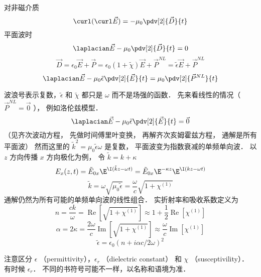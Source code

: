 
对非磁介质
\begin{equation}
  \curl (\curl \vec E) =  - {\mu_0} \pdv[2]{\vec D}{t}
 \end{equation}
平面波时
 \begin{equation}
  {\laplacian}\vec E - {\mu_0} \pdv[2]{\vec D}{t} = 0
 \end{equation}
 \begin{equation}
\vec D = {\epsilon_0}\vec E + \vec P = {\epsilon_0}(1 + \tilde \chi )\vec E + {\vec P^{NL}} = \tilde \epsilon \vec E + {\vec P^{NL}}
 \end{equation}
 \begin{equation}
{\laplacian}\vec E - {\mu_0}\tilde \epsilon \pdv[2]{\vec E}{t} = {\mu_0} \pdv[2]{\vec P^{NL}}{t}
 \end{equation}
 
波浪号表示复数，$\tilde \epsilon$ 和 $\tilde \chi $ 都只是 $\omega $ 而不是场强的函数． 先来看线性的情况（ ${\vec P^{NL}} = \vec 0$ ）， 例如洛伦兹模型．
\begin{equation}
{\laplacian}\vec E - {\mu_0}\tilde \epsilon \pdv[2]{\vec E}{t} = \vec 0
 \end{equation}
（见齐次波动方程， 先做时间傅里叶变换， 再解齐次亥姆霍兹方程， 通解是所有平面波） 然而这里的 ${\tilde k^2} = {\mu_0}\tilde \epsilon \omega$ 是复数， 平面波变为指数衰减的单频单向波． 以 $z$ 方向传播 $x$ 方向极化为例， 令  $\tilde k = k + \kappa $ 
\begin{equation}
{E_x}(z,t) = {\tilde E_{0x}}{\E^{\I(\tilde kz - \omega t)}} = {\tilde E_{0x}}{\E^{ - \kappa z}}{\E^{\I(kz - \omega t)}}
\end{equation}
\begin{equation}
\tilde k = \omega \sqrt {{\mu_0}\tilde \epsilon }  = \frac{\omega }{c}\sqrt {1 + {\chi ^{(1)}}}
\end{equation}
通解仍然为所有可能的单频单向波的线性组合． 实折射率和吸收系数定义为
\begin{equation}
n = \frac{{ck}}{\omega } = \operatorname{Re} \left[ {\sqrt {1 + {\chi ^{(1)}}} } \right] \approx 1 + \frac{1}{2}\operatorname{Re} [{\chi ^{(1)}}]
\end{equation}
\begin{equation}
\alpha  = 2\kappa  = \frac{{2\omega }}{c}\operatorname{Im} \left[ {\sqrt {1 + {\chi ^{(1)}}} } \right] \approx \frac{\omega }{c}\operatorname{Im} [{\chi ^{(1)}}]
\end{equation}
\begin{equation}
\tilde \epsilon  = {\epsilon_0}{(n + i\alpha c/2\omega )^2}
\end{equation}
 
注意区分 $\epsilon$ 
（permittivity），${\epsilon_r}$ （dielectric constant） 和 $\chi $ （susceptivility）． 有时候 ${\epsilon_r}$． 不同的书符号可能不一样，以名称和语境为准．

